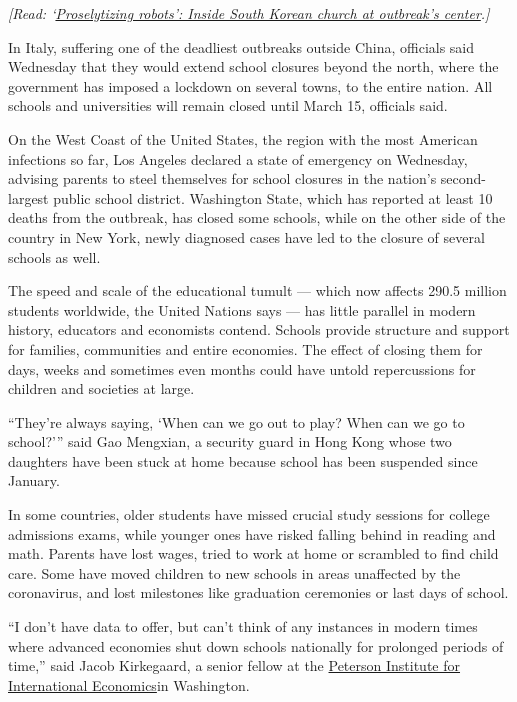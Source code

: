 \emph{{[}Read:
`}\href{https://www.nytimes3xbfgragh.onion/2020/03/10/world/asia/south-korea-coronavirus-shincheonji.html}{\emph{Proselytizing
robots': Inside South Korean church at outbreak's center}}\emph{.{]}}

In Italy, suffering one of the deadliest outbreaks outside China,
officials said Wednesday that they would extend school closures beyond
the north, where the government has imposed a lockdown on several towns,
to the entire nation. All schools and universities will remain closed
until March 15, officials said.

On the West Coast of the United States, the region with the most
American infections so far, Los Angeles declared a state of emergency on
Wednesday, advising parents to steel themselves for school closures in
the nation's second-largest public school district. Washington State,
which has reported at least 10 deaths from the outbreak, has closed some
schools, while on the other side of the country in New York, newly
diagnosed cases have led to the closure of several schools as well.

The speed and scale of the educational tumult --- which now affects
290.5 million students worldwide, the United Nations says --- has little
parallel in modern history, educators and economists contend. Schools
provide structure and support for families, communities and entire
economies. The effect of closing them for days, weeks and sometimes even
months could have untold repercussions for children and societies at
large.

``They're always saying, `When can we go out to play? When can we go to
school?''' said Gao Mengxian, a security guard in Hong Kong whose two
daughters have been stuck at home because school has been suspended
since January.

In some countries, older students have missed crucial study sessions for
college admissions exams, while younger ones have risked falling behind
in reading and math. Parents have lost wages, tried to work at home or
scrambled to find child care. Some have moved children to new schools in
areas unaffected by the coronavirus, and lost milestones like graduation
ceremonies or last days of school.

``I don't have data to offer, but can't think of any instances in modern
times where advanced economies shut down schools nationally for
prolonged periods of time,'' said Jacob Kirkegaard, a senior fellow at
the \href{https://www.piie.com/}{Peterson Institute for International
Economics}in Washington.


